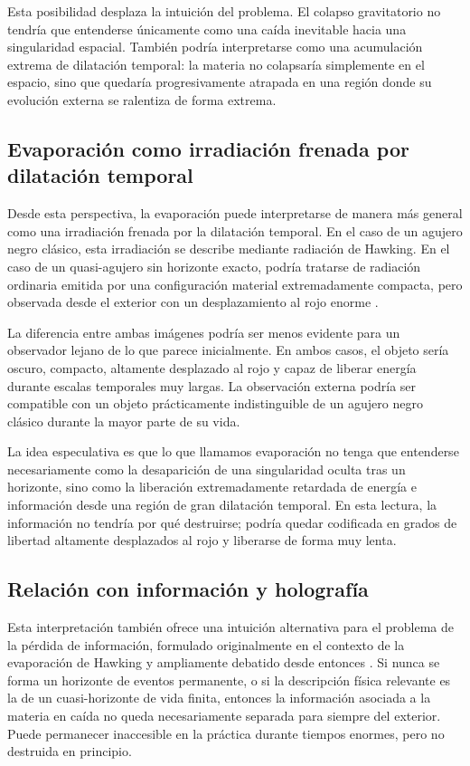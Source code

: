 \documentclass[
aps,
prd,
reprint,
superscriptaddress,
nofootinbib,
amsmath,
amssymb
]{revtex4-2}
\begin{document}
Esta posibilidad desplaza la intuición del problema. El colapso gravitatorio no tendría que entenderse únicamente como una caída inevitable hacia una singularidad espacial. También podría interpretarse como una acumulación extrema de dilatación temporal: la materia no colapsaría simplemente en el espacio, sino que quedaría progresivamente atrapada en una región donde su evolución externa se ralentiza de forma extrema.

\subsection{Evaporación como irradiación frenada por dilatación temporal}

Desde esta perspectiva, la evaporación puede interpretarse de manera más general como una irradiación frenada por la dilatación temporal. En el caso de un agujero negro clásico, esta irradiación se describe mediante radiación de Hawking. En el caso de un quasi-agujero sin horizonte exacto, podría tratarse de radiación ordinaria emitida por una configuración material extremadamente compacta, pero observada desde el exterior con un desplazamiento al rojo enorme \cite{Barcelo2011,Vachaspati2007}.

La diferencia entre ambas imágenes podría ser menos evidente para un observador lejano de lo que parece inicialmente. En ambos casos, el objeto sería oscuro, compacto, altamente desplazado al rojo y capaz de liberar energía durante escalas temporales muy largas. La observación externa podría ser compatible con un objeto prácticamente indistinguible de un agujero negro clásico durante la mayor parte de su vida.

La idea especulativa es que lo que llamamos evaporación no tenga que entenderse necesariamente como la desaparición de una singularidad oculta tras un horizonte, sino como la liberación extremadamente retardada de energía e información desde una región de gran dilatación temporal. En esta lectura, la información no tendría por qué destruirse; podría quedar codificada en grados de libertad altamente desplazados al rojo y liberarse de forma muy lenta.

\subsection{Relación con información y holografía}

Esta interpretación también ofrece una intuición alternativa para el problema de la pérdida de información, formulado originalmente en el contexto de la evaporación de Hawking y ampliamente debatido desde entonces \cite{Hawking1976,Page1993,UnruhWald2017}. Si nunca se forma un horizonte de eventos permanente, o si la descripción física relevante es la de un cuasi-horizonte de vida finita, entonces la información asociada a la materia en caída no queda necesariamente separada para siempre del exterior. Puede permanecer inaccesible en la práctica durante tiempos enormes, pero no destruida en principio.
\end{document}
